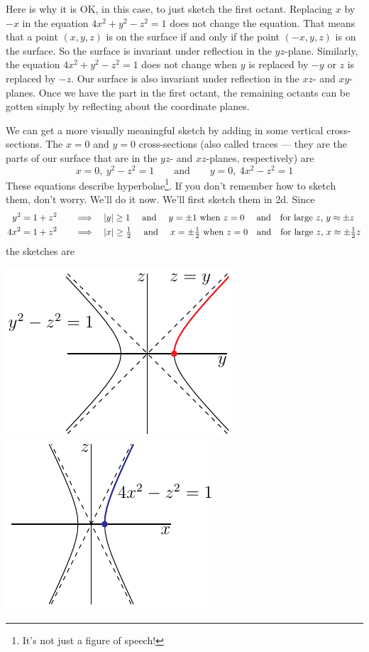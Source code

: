 \begin{eg}[$4x^2+y^2-z^2=1$]
Here is why it is OK, in this case, to just sketch the first octant.
Replacing $x$ by $-x$ in the equation $4x^2+y^2-z^2=1$
does not change the equation. That means that a point $(x,y,z)$ is on the
surface if and only if the point $(-x,y,z)$ is on the surface. So the surface
is invariant under reflection in the $yz$-plane. Similarly, the equation
$4x^2+y^2-z^2=1$ does not change when $y$ is replaced by $-y$ or $z$ is
replaced by $-z$. Our surface is also invariant under reflection in the $xz$-
and $xy$-planes. Once we have the part in the first octant, the remaining 
octants can be gotten simply by reflecting about the coordinate planes.

We can get a more visually meaningful sketch by adding in some vertical
cross-sections. The $x=0$ and $y=0$ cross-sections (also called traces
--- they are the parts of our surface that are in the $yz$- and $xz$-planes,
respectively)
are
\begin{equation*}
x=0,\ y^2-z^2=1\qquad\text{and}\qquad
y=0,\ 4x^2-z^2=1
\end{equation*}
These equations describe hyperbolae\footnote{It's not just a figure of speech!}. If you don't remember how to sketch them, don't worry. We'll
do it now. We'll first sketch them in 2d. Since
\begin{alignat*}{3}
y^2&=1+z^2 &\quad\implies\quad
   &|y|\ge 1\quad\text{ and }\quad 
    y=\pm 1\text{ when }z=0\quad
    \text{ and\quad for large $z$, }y\approx\pm z \\
4x^2&=1+z^2 & \quad\implies\quad
   &|x|\ge \tfrac{1}{2}\quad\text{ and }\quad 
   x=\pm\tfrac{1}{2}\text{ when }z=0\quad 
   \text{and\quad for large $z$, }x\approx\pm \tfrac{1}{2}z
\end{alignat*}
the sketches are
\begin{efig}
\begin{center}
   \includegraphics{hyperbolaXa.pdf}\qquad
   \includegraphics{hyperbolaYa.pdf}

\end{center}
\end{efig}
\end{eg}
